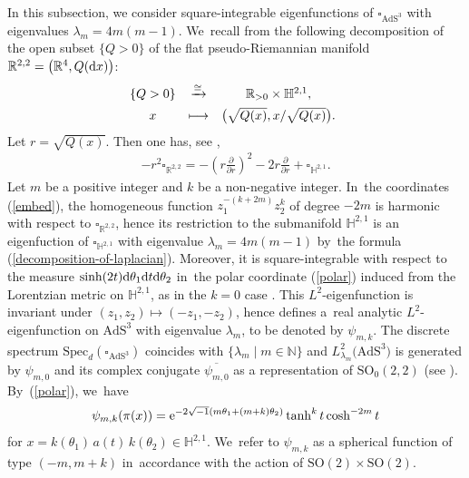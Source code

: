\documentclass[10pt,a4paper]{amsart}
\numberwithin{equation}{section}
\begin{document}
In this subsection, we consider square-integrable eigenfunctions of
$\square_{\mathrm{AdS}^{3}}$ with eigenvalues $\lambda_{m}=4m(m-1)$. We~recall from \cite[Section~9]{KaKob16} the following decomposition of the open subset $\{Q > 0\}$ of
the flat pseudo-Riemannian manifold $\mathbb{R}^{2,2}=\big(\mathbb{R}^{4},Q({\rm d}x)\big)$:
\begin{align*}
\begin{array}{@{}ccc}
\{Q > 0\} & \xrightarrow{\cong} & \mathbb{R}_{>0} \times \mathbb{H}^{2,1}, \\[1ex]
x & \longmapsto & \big(\sqrt{Q(x)}, x/\sqrt{Q(x)}\big).
\end{array}
\end{align*}
Let $r=\sqrt{Q(x)}$. Then one has, see \cite[p.~215]{KaKob16},
\begin{align}
\label{decomposition-of-laplacian}
-r^2\square_{\mathbb{R}^{2,2}} = -\left(r\frac{\partial}{\partial r}\right)^2 - 2r\frac{\partial}{\partial r} + \square_{\mathbb{H}^{2,1}}.
\end{align}
Let $m$ be a positive integer and $k$ be a non-negative integer. In~the coordinates (\ref{embed}),
the homogeneous function $z_{1}^{-(k+2m)}z_{2}^{k}$ of degree $-2m$
 is harmonic with respect to $\square_{\mathbb{R}^{2,2}}$,
hence its restriction to the submanifold $\mathbb{H}^{2,1}$ is
an eigenfuction of $\square_{\mathbb{H}^{2,1}}$ with eigenvalue $\lambda_{m}=4m(m-1)$
by~the formula (\ref{decomposition-of-laplacian}).
Moreover, it is square-integrable with respect to the measure
$\sinh(2t){\rm d}\theta_{1}{\rm d}t{\rm d}\theta_{2}$ in~the polar coordinate (\ref{polar})
induced from the Lorentzian metric on $\mathbb{H}^{2,1}$,
as in the $k=0$ case \cite[Section~9]{KaKob16}.
This $L^{2}$-eigenfunction is invariant under $(z_{1},z_{2})\mapsto(-z_{1},-z_{2})$,
hence defines a~real analytic $L^{2}$-eigenfunction on $\mathrm{AdS}^{3}$
with eigenvalue $\lambda_{m}$, to be denoted by $\psi_{m,k}$.
The discrete spectrum
$\mathrm{Spec}_{d}(\square_{\mathrm{AdS}^{3}})$ coincides with
$\{\lambda_{m} \mid m \in \mathbb{N}\}$
and $L^{2}_{\lambda_{m}}\big(\mathrm{AdS}^{3}\big)$ is generated by
$\psi_{m,0}$ and its complex conjugate $\overline{\psi_{m,0}}$
as a representation of $\mathrm{SO}_{0}(2,2)$ (see \cite[Claim~9.12]{KaKob16}).
By~(\ref{polar}), we~have
\begin{align}
\label{polarFJ}
\psi_{m,k}(\pi(x))
= {\rm e}^{-2\sqrt{-1}(m\theta_1 + (m+k)\theta_2)}\tanh^{k}t\cosh^{-2m}t
\end{align}
for $x=k(\theta_1)\,a(t)\,k(\theta_2)\in\mathbb{H}^{2,1}$. We~refer to $\psi_{m,k}$ as a spherical function of type $(-m,m+k)$
in~accordance with the action of
$\mathrm{SO}(2)\times\mathrm{SO}(2)$.
\end{document}
